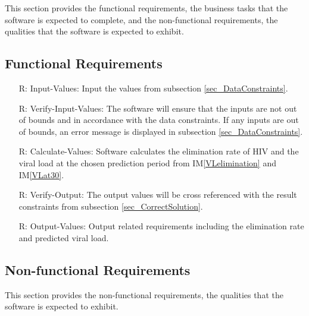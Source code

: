 \documentclass[12pt]{article}
\newcommand{\iref}[1]{IM\ref{#1}}
\newcounter{reqnum} %
\begin{document}
This section provides the functional requirements, the business tasks that the
software is expected to complete, and the non-functional requirements, the
qualities that the software is expected to exhibit.

\subsection{Functional Requirements}
\label{sec_FunctionalReq}

\noindent \begin{itemize}

\item[R\refstepcounter{reqnum}\thereqnum \label{R_Inputs}:]Input-Values: Input 
the values from subsection
 \ref{sec_DataConstraints}.

\item[R\refstepcounter{reqnum}\thereqnum \label{R_VerifyInputs}:] 
Verify-Input-Values: The software will ensure that the inputs are not out of 
bounds and in accordance with the data constraints. If any inputs are out of 
bounds, an error message is displayed in subsection \ref{sec_DataConstraints}.
    
\item[R\refstepcounter{reqnum}\thereqnum \label{R_Calculate}:] 
Calculate-Values: Software calculates the elimination rate of HIV and the viral 
load at the chosen prediction period from \iref{VLelimination} and 
\iref{VLat30}.

\item[R\refstepcounter{reqnum}\thereqnum \label{R_VerifyOutput}:]
Verify-Output: The output values will be cross referenced with the result 
constraints from subsection \ref{sec_CorrectSolution}.

\item[R\refstepcounter{reqnum}\thereqnum \label{R_Output}:] 
Output-Values: Output related requirements including the elimination rate and 
predicted viral load.

\end{itemize}


\subsection{Non-functional Requirements}

This section provides the non-functional requirements, the qualities that the 
software is expected to exhibit.
\end{document}
